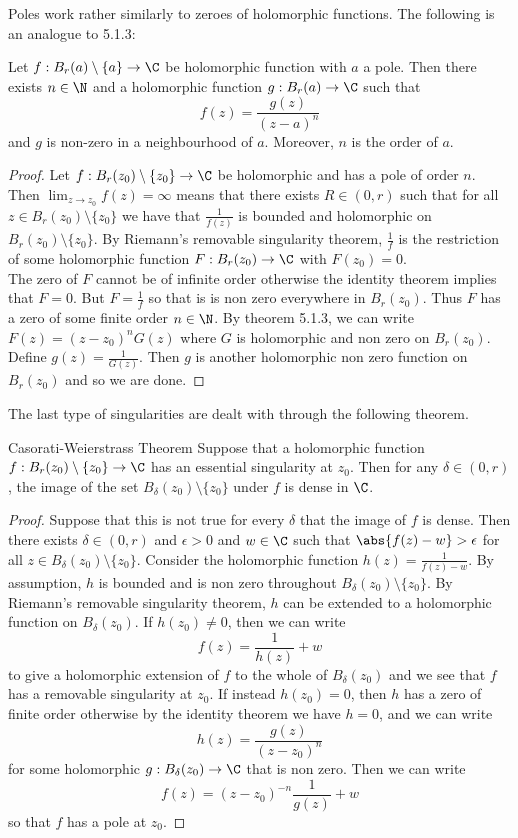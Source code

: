 \documentclass[a4paper]{article}
\begin{document}
Poles work rather similarly to zeroes of holomorphic functions. The following is an analogue to 5.1.3: 

\begin{prp}{}{} Let $f:B_r(a)\setminus\{a\}\to\C$ be holomorphic function with $a$ a pole. Then there exists $n\in\N$ and a holomorphic function $g:B_r(a)\to\C$ such that $$f(z)=\frac{g(z)}{(z-a)^n}$$ and $g$ is non-zero in a neighbourhood of $a$. Moreover, $n$ is the order of $a$. 
\begin{proof}
Let $f:B_r(z_0)\setminus\{z_0\}\to\C$ be holomorphic and has a pole of order $n$. Then $\lim_{z\to z_0}f(z)=\infty$ means that there exists $R\in(0,r)$ such that for all $z\in B_r(z_0)\setminus\{z_0\}$ we have that $\frac{1}{f(z)}$ is bounded and holomorphic on $B_r(z_0)\setminus\{z_0\}$. By Riemann's removable singularity theorem, $\frac{1}{f}$ is the restriction of some holomorphic function $F:B_r(z_0)\to\C$ with $F(z_0)=0$. \\

The zero of $F$ cannot be of infinite order otherwise the identity theorem implies that $F=0$. But $F=\frac{1}{f}$ so that is is non zero everywhere in $B_r(z_0)$. Thus $F$ has a zero of some finite order $n\in\N$. By theorem 5.1.3, we can write $F(z)=(z-z_0)^nG(z)$ where $G$ is holomorphic and non zero on $B_r(z_0)$. Define $g(z)=\frac{1}{G(z)}$. Then $g$ is another holomorphic non zero function on $B_r(z_0)$ and so we are done. 
\end{proof}
\end{prp}

The last type of singularities are dealt with through the following theorem. 

\begin{thm}{Casorati-Weierstrass Theorem}{} Suppose that a holomorphic function $f:B_r(z_0)\setminus\{z_0\}\to\C$ has an essential singularity at $z_0$. Then for any $\delta\in(0,r)$, the image of the set $B_\delta(z_0)\setminus\{z_0\}$ under $f$ is dense in $\C$. 
\begin{proof}
Suppose that this is not true for every $\delta$ that the image of $f$ is dense. Then there exists $\delta\in(0,r)$ and $\epsilon>0$ and $w\in\C$ such that $\abs{f(z)-w}>\epsilon$ for all $z\in B_\delta(z_0)\setminus\{z_0\}$. Consider the holomorphic function $h(z)=\frac{1}{f(z)-w}$. By assumption, $h$ is bounded and is non zero throughout $B_\delta(z_0)\setminus\{z_0\}$. By Riemann's removable singularity theorem, $h$ can be extended to a holomorphic function on $B_\delta(z_0)$. If $h(z_0)\neq 0$, then we can write $$f(z)=\frac{1}{h(z)}+w$$ to give a holomorphic extension of $f$ to the whole of $B_\delta(z_0)$ and we see that $f$ has a removable singularity at $z_0$. If instead $h(z_0)=0$, then $h$ has a zero of finite order otherwise by the identity theorem we have $h=0$, and we can write $$h(z)=\frac{g(z)}{(z-z_0)^n}$$ for some holomorphic $g:B_\delta(z_0)\to\C$ that is non zero. Then we can write $$f(z)=(z-z_0)^{-n}\frac{1}{g(z)}+w$$ so that $f$ has a pole at $z_0$. 
\end{proof}
\end{thm}
\end{document}

